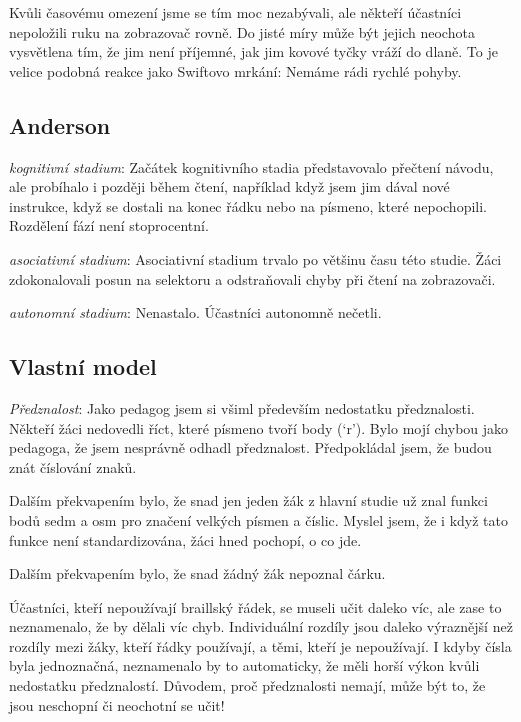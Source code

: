Kvůli časovému omezení jsme se tím moc nezabývali, ale někteří účastníci nepoložili ruku na zobrazovač rovně.  Do jisté míry může být jejich neochota vysvětlena tím, že jim není příjemné, jak jim kovové tyčky vráží do dlaně.  To je velice podobná reakce jako Swiftovo mrkání:  Nemáme rádi rychlé pohyby.

\subsection{Anderson}

\textit{kognitivní stadium}: Začátek kognitivního stadia představovalo přečtení návodu, ale probíhalo i později během čtení, například když jsem jim dával nové instrukce, když se dostali na konec řádku nebo na písmeno, které nepochopili.  Rozdělení fází není stoprocentní.

\textit{asociativní stadium}: Asociativní stadium trvalo po většinu času této studie.  Žáci zdokonalovali posun na selektoru a odstraňovali chyby při čtení na zobrazovači.

\textit{autonomní stadium}: Nenastalo. Účastníci autonomně nečetli.

\subsection{Vlastní model}

\textit{Předznalost}:
Jako pedagog jsem si všiml především nedostatku předznalosti.
Někteří žáci nedovedli říct, které písmeno tvoří body (`r'). Bylo mojí chybou jako pedagoga, že jsem nesprávně odhadl předznalost.  Předpokládal jsem, že budou znát číslování znaků. 

Dalším překvapením bylo, že snad jen jeden žák z hlavní studie už znal funkci bodů sedm a osm pro značení velkých písmen a číslic.  Myslel jsem, že i když tato funkce není standardizována, žáci hned pochopí, o co jde.

Dalším překvapením bylo, že snad žádný žák nepoznal čárku.

Účastníci, kteří nepoužívají braillský řádek, se museli učit daleko víc, ale zase to neznamenalo, že by dělali víc chyb. Individuální rozdíly jsou daleko výraznější než rozdíly mezi žáky, kteří řádky používají, a těmi, kteří je nepoužívají.  I kdyby čísla byla jednoznačná, neznamenalo by to automaticky, že měli horší výkon kvůli nedostatku předznalostí. Důvodem, proč předznalosti nemají, může být to, že jsou neschopní či neochotní se učit!

